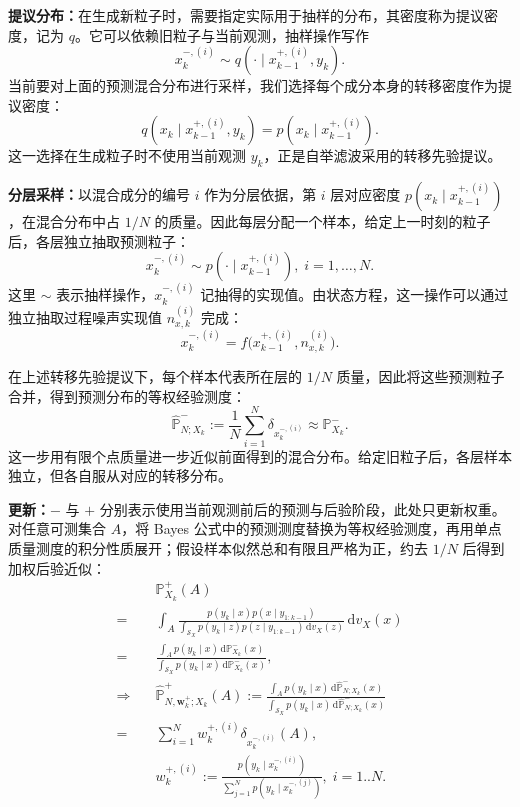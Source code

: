 \textbf{提议分布：}在生成新粒子时，需要指定实际用于抽样的分布，其密度称为提议密度，记为 $q$。它可以依赖旧粒子与当前观测，抽样操作写作
\begin{equation}\label{cw:eq:10}
x_k^{-,(i)}\sim q(\cdot\mid x_{k-1}^{+,(i)},y_k).
\end{equation}
当前要对上面的预测混合分布进行采样，我们选择每个成分本身的转移密度作为提议密度：
\begin{equation}\label{cw:eq:11}
q(x_k\mid x_{k-1}^{+,(i)},y_k)=p(x_k\mid x_{k-1}^{+,(i)}).
\end{equation}
这一选择在生成粒子时不使用当前观测 $y_k$，正是自举滤波采用的转移先验提议。

\textbf{分层采样：}以混合成分的编号 $i$ 作为分层依据，第 $i$ 层对应密度 $p(x_k\mid x_{k-1}^{+,(i)})$，在混合分布中占 $1/N$ 的质量。因此每层分配一个样本，给定上一时刻的粒子后，各层独立抽取预测粒子：
\begin{equation}\label{cw:eq:12}
x_k^{-,(i)}\sim p(\cdot\mid x_{k-1}^{+,(i)}),\;i=1,\dots,N.
\end{equation}
这里 $\sim$ 表示抽样操作，$x_k^{-,(i)}$ 记抽得的实现值。由状态方程，这一操作可以通过独立抽取过程噪声实现值 $n_{x,k}^{(i)}$ 完成：
\begin{equation}\label{cw:eq:13}
x_k^{-,(i)}=f\bigl(x_{k-1}^{+,(i)},n_{x,k}^{(i)}\bigr).
\end{equation}

在上述转移先验提议下，每个样本代表所在层的 $1/N$ 质量，因此将这些预测粒子合并，得到预测分布的等权经验测度：
\begin{equation}\label{cw:eq:14}
\hat{\mathbb{P}}_{N;X_k}^-:=\frac1N\sum_{i=1}^N\delta_{x_k^{-,(i)}}
\approx\mathbb{P}_{X_k}^-.
\end{equation}
这一步用有限个点质量进一步近似前面得到的混合分布。给定旧粒子后，各层样本独立，但各自服从对应的转移分布。

\textbf{更新：}$-$ 与 $+$ 分别表示使用当前观测前后的预测与后验阶段，此处只更新权重。
对任意可测集合 $A$，将 Bayes 公式中的预测测度替换为等权经验测度，再用单点质量测度的积分性质展开；假设样本似然总和有限且严格为正，约去 $1/N$ 后得到加权后验近似：
\begin{equation}\label{cw:eq:particle-update}
\begin{aligned}
&\mathbb{P}_{X_k}^+(A)\\
={}&\int_A\frac{p(y_k\mid x)p(x\mid y_{1:k-1})}{\displaystyle\int_{\mathcal{S}_X}p(y_k\mid z)p(z\mid y_{1:k-1})\,\mathrm{d}v_X(z)}\,\mathrm{d}v_X(x)\\
={}&\frac{\displaystyle\int_A p(y_k\mid x)\,\mathrm{d}\mathbb{P}_{X_k}^-(x)}{\displaystyle\int_{\mathcal{S}_X}p(y_k\mid x)\,\mathrm{d}\mathbb{P}_{X_k}^-(x)},\\
\Rightarrow\quad &\hat{\mathbb{P}}_{N,\bm w_k^+;X_k}^+(A):=\frac{\displaystyle\int_A p(y_k\mid x)\,\mathrm{d}\hat{\mathbb{P}}_{N;X_k}^-(x)}{\displaystyle\int_{\mathcal{S}_X}p(y_k\mid x)\,\mathrm{d}\hat{\mathbb{P}}_{N;X_k}^-(x)}\\
={}&\sum_{i=1}^N w_k^{+,(i)}\delta_{x_k^{-,(i)}}(A),\\
&w_k^{+,(i)}:=\frac{p(y_k\mid x_k^{-,(i)})}{\displaystyle\sum_{j=1}^N p(y_k\mid x_k^{-,(j)})},\;i=1..N.
\end{aligned}
\end{equation}

